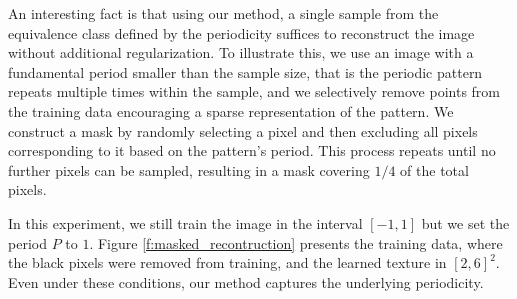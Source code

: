 



An interesting fact is that using our method, a single sample from the equivalence class defined by the periodicity suffices to reconstruct the image without additional regularization. To illustrate this, we use an image with a fundamental period smaller than the sample size, that is the periodic pattern repeats multiple times within the sample, and we selectively remove points from the training data encouraging a sparse representation of the pattern. We construct a mask by randomly selecting a pixel and then excluding all pixels corresponding to it based on the pattern's period. This process repeats until no further pixels can be sampled, resulting in a mask covering $1/4$ of the total pixels. 

In this experiment, we still train the image in the interval $[-1, 1]$ but we set the period $P$ to $1$. Figure \ref{f:masked_recontruction} presents the training data, where the black pixels were removed from training, and the learned texture in $[2, 6]^2$. Even under these conditions, our method captures the underlying periodicity.

